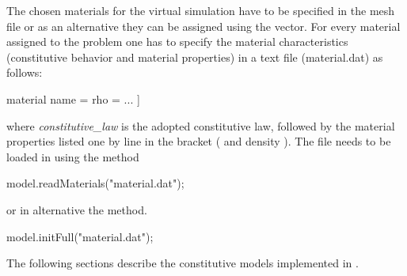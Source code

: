 The chosen materials for the virtual simulation have to be specified
in the mesh file or as an alternative they can be assigned using the
 vector.  For every material assigned to the
problem one has to specify the material characteristics (constitutive
behavior and material properties) in a text file (\eg material.dat) as
follows:
\begin{cpp} 
  material %
  name = %
  rho = %
  ...  
  ]
\end{cpp} 
 where \emph{constitutive\_law} is
the adopted constitutive law, followed by the material properties
listed one by line in the bracket (\eg {} and density
). The file needs to be loaded in \akantu using the
 method
\begin{cpp} 
model.readMaterials("material.dat");
\end{cpp} 
or in alternative the  method.
\begin{cpp} 
model.initFull("material.dat");
\end{cpp} 
The following sections describe the constitutive models
implemented in \akantu.

